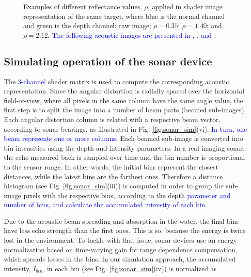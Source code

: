 \documentclass[final,5p,times]{elsarticle}
\begin{document}
\begin{figure}[!ht]
{        \label{fig:reflectance:view:2_12}
    }
    \captionsetup{justification=justified}
    \caption{Examples of different reflectance values, $\rho$, applied in
    shader image representation of the same target, where blue is the normal channel and
    green is the depth channel:  raw image;
     $\rho = 0.35$;
     $\rho = 1.40$; and
     $\rho = 2.12$. \textcolor{blue}{The following
    acoustic images are presented in ,
    , 
    and .}}
    \label{fig:sonar_reflectances}
\end{figure}


\subsection{Simulating operation of the sonar device}
\label{dev:sonardata}

The \textcolor{blue}{3-channel} shader matrix is used to compute the corresponding acoustic representation. Since the angular distortion is radially spaced over the horizontal field-of-view, where all pixels in the same column have the same angle value, the first step is to split the image into a number of beam parts (beamed sub-images). Each angular distortion column is related with a respective beam vector, according to sonar bearings, as illustrated in Fig. \ref{fig:sonar_sim}(vi).
\textcolor{blue}{In turn, one beam represents one or more columns.} Each
beamed sub-image is converted into bin intensities using the depth and
intensity parameters. In a real imaging sonar, the echo
measured back is sampled
over time and the bin number is proportional to the sensor range. In other
words, the initial bins represent the closest distances, while the latest
bins are the farthest ones. Therefore a distance histogram (see Fig. \ref{fig:sonar_sim}(iii)) is computed in order to
group the sub-image pixels with the respective bins, according to the
depth \textcolor{blue}{parameter and number of bins,
and calculate the accumulated intensity of each bin.}

Due to the acoustic beam spreading and absorption in the water, the final
bins have less echo strength than the first ones. This is so, because the energy is
twice lost in the environment. To tackle with that issue, sonar devices
use an energy normalization based on time-varying gain for range dependence
compensation, which spreads losses in the bins. In our simulation approach,
the accumulated intensity, $I_{bin}$, in each bin (see Fig. \ref{fig:sonar_sim}(iv)) is normalized as
\end{document}
